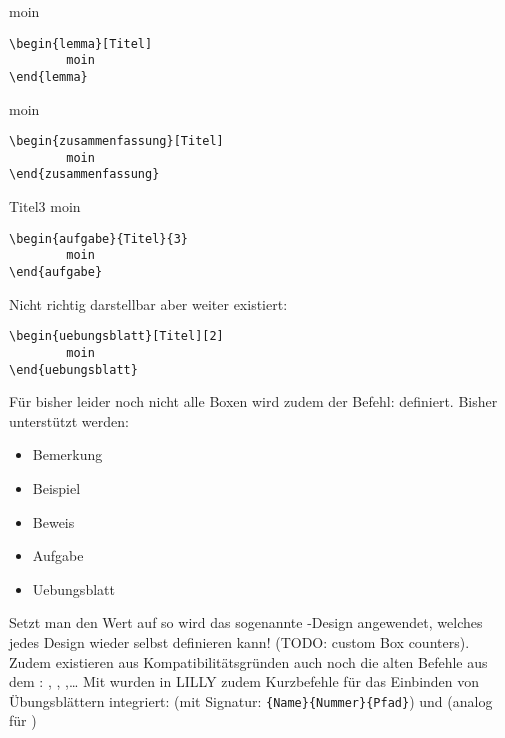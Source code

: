 {\begin{multicols}{2}
\begingroup\begin{lemma}[Titel]
moin
\begin{lstlisting}[language=lLatex]
\begin{lemma}[Titel]
        moin
\end{lemma}\end{lstlisting}
\end{lemma}\endgroup

\begingroup\begin{zusammenfassung}[Titel]
moin
\begin{lstlisting}[language=lLatex]
\begin{zusammenfassung}[Titel]
        moin
\end{zusammenfassung}\end{lstlisting}
\end{zusammenfassung}\endgroup

\begingroup\begin{aufgabe}{Titel}{3}
moin
\begin{lstlisting}[language=lLatex]
\begin{aufgabe}{Titel}{3}
        moin
\end{aufgabe}\end{lstlisting}
\end{aufgabe}\endgroup

Nicht richtig darstellbar aber weiter existiert:
\begin{lstlisting}[language=lLatex]
\begin{uebungsblatt}[Titel][2]
        moin
\end{uebungsblatt}\end{lstlisting}

\end{multicols}}
Für bisher leider noch nicht alle Boxen wird zudem der Befehl:  definiert. Bisher unterstützt werden:
\begin{multicols}{3}
    \begin{itemize}[label=$\diamond$]\narrowitems
        \item Bemerkung
        \item Beispiel
        \item Beweis
        \item Aufgabe
        \item Uebungsblatt
    \end{itemize}
\end{multicols}
Setzt man den Wert auf  so wird das sogenannte -Design angewendet, welches jedes Design wieder selbst definieren kann! (TODO: custom Box counters).\newline
Zudem existieren aus Kompatibilitätsgründen auch noch die alten Befehle aus dem : , , ,\ldots\medskip\newline
Mit  wurden in LILLY zudem Kurzbefehle für das Einbinden von Übungsblättern integriert:
 (mit Signatur: \verb|{Name}{Nummer}{Pfad}|) und  (analog für )\normalfont


